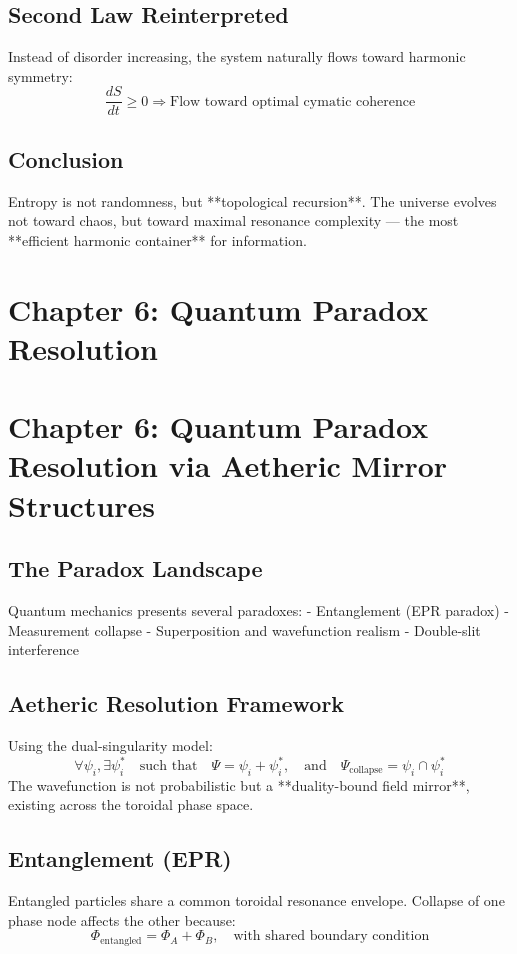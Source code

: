 \documentclass[12pt]{book}
\begin{document}
\subsection*{Second Law Reinterpreted}
Instead of disorder increasing, the system naturally flows toward harmonic symmetry:
\[
\frac{dS}{dt} \geq 0 \Rightarrow \text{Flow toward optimal cymatic coherence}
\]

\subsection*{Conclusion}
Entropy is not randomness, but **topological recursion**. The universe evolves not toward chaos, but toward maximal resonance complexity — the most **efficient harmonic container** for information.



\section*{Chapter 6: Quantum Paradox Resolution}


\section*{Chapter 6: Quantum Paradox Resolution via Aetheric Mirror Structures}

\subsection*{The Paradox Landscape}
Quantum mechanics presents several paradoxes:
- Entanglement (EPR paradox)
- Measurement collapse
- Superposition and wavefunction realism
- Double-slit interference

\subsection*{Aetheric Resolution Framework}
Using the dual-singularity model:
\[
\forall \psi_i, \exists \psi_i^* \quad \text{such that} \quad \Psi = \psi_i + \psi_i^*, \quad \text{and} \quad \Psi_{\text{collapse}} = \psi_i \cap \psi_i^*
\]
The wavefunction is not probabilistic but a **duality-bound field mirror**, existing across the toroidal phase space.

\subsection*{Entanglement (EPR)}
Entangled particles share a common toroidal resonance envelope. Collapse of one phase node affects the other because:
\[
\Phi_{\text{entangled}} = \Phi_A + \Phi_B, \quad \text{with shared boundary condition}
\]
\end{document}

